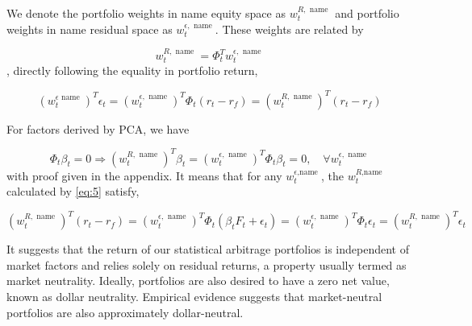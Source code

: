 \documentclass[12pt,article]{memoir}
\begin{document}

We denote the portfolio weights in name equity space as $w_t^{R, \text { name }}$ and portfolio weights in name residual space as $w_t^{\epsilon, \text { name }}$. These weights are related by

\begin{equation}\label{eq:5}
	w_t^{R, \text { name }}=\Phi_t^T w_t^{\epsilon, \text { name }}
\end{equation}
, directly following the equality in portfolio return,

\begin{equation}\label{eq:6}
	\left(w_t^{\epsilon \text { name }}\right)^T \epsilon_t=\left(w_t^{\epsilon, \text { name }}\right)^T \Phi_t\left(r_t-r_f\right)=\left(w_t^{R, \text { name }}\right)^T\left(r_t-r_f\right)
\end{equation}

For factors derived by PCA, we have

\begin{equation}\label{eq:7}
	\Phi_t \beta_t=0 \Longrightarrow\left(w_t^{R, \text { name }}\right)^T \beta_t=\left(w_t^{\epsilon, \text { name }}\right)^T \Phi_t \beta_t=0, \quad \forall w_t^{\epsilon, \text { name }}
\end{equation}
with proof given in the appendix. It means that for any $w_t^{\epsilon \text {,name }}$, the $w_t^{R \text {,name }}$ calculated by \cref{eq:5} satisfy,

\begin{equation}\label{eq:8}
	\left(w_t^{R, \text { name }}\right)^T\left(r_t-r_f\right)=\left(w_t^{\epsilon, \text { name }}\right)^T \Phi_t\left(\beta_t F_t+\epsilon_t\right)=\left(w_t^{\epsilon, \text { name }}\right)^T \Phi_t \epsilon_t=\left(w_t^{R, \text { name }}\right)^T \epsilon_t
\end{equation}

It suggests that the return of our statistical arbitrage portfolios is independent of market factors and relies solely on residual returns, a property usually termed as market neutrality. Ideally, portfolios are also desired to have a zero net value, known as dollar neutrality. Empirical evidence suggests that market-neutral portfolios are also approximately dollar-neutral.
\end{document}
